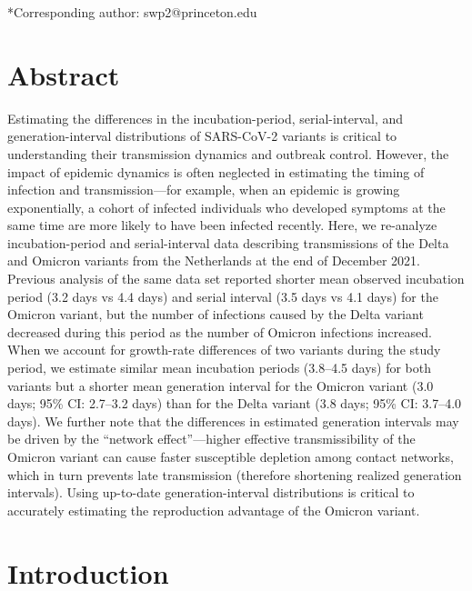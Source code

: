 \documentclass[12pt]{article}
\begin{document}
\begin{flushleft}{
	\Large
	\textbf{}
}
*Corresponding author: swp2@princeton.edu
\bigskip

\section*{Abstract}

Estimating the differences in the incubation-period, serial-interval, and generation-interval distributions of SARS-CoV-2 variants is critical to understanding their transmission dynamics and outbreak control.
However, the impact of epidemic dynamics is often neglected in estimating the timing of infection and transmission---for example, when an epidemic is growing exponentially, a cohort of infected individuals who developed symptoms at the same time are more likely to have been infected recently.
Here, we re-analyze incubation-period and serial-interval data describing transmissions of the Delta and Omicron variants from the Netherlands at the end of December 2021.
Previous analysis of the same data set reported shorter mean observed incubation period (3.2 days vs 4.4 days) and serial interval (3.5 days vs 4.1 days) for the Omicron variant, but the number of infections caused by the Delta variant decreased during this period as the number of Omicron infections increased.
When we account for growth-rate differences of two variants during the study period, we estimate similar mean incubation periods (3.8--4.5 days) for both variants but a shorter mean generation interval for the Omicron variant (3.0 days; 95\% CI: 2.7--3.2 days) than for the Delta variant (3.8 days; 95\% CI: 3.7--4.0 days).
We further note that the differences in estimated generation intervals may be driven by the ``network effect''---higher effective transmissibility of the Omicron variant can cause faster susceptible depletion among contact networks, which in turn prevents late transmission (therefore shortening realized generation intervals).
Using up-to-date generation-interval distributions is critical to accurately estimating the reproduction advantage of the Omicron variant.

\end{flushleft}

\pagebreak

\section{Introduction}
\end{document}
